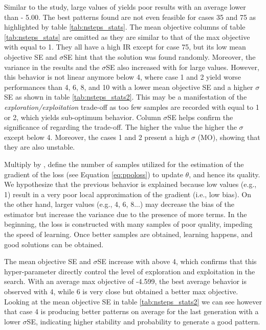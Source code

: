Similar to the  study, large values of  yields poor results with an average lower than - 5.00. The best patterns found are not even feasible for cases 35 and 75 as highlighted by table \ref{tab:nsteps_stats}. The mean objective columns of table \ref{tab:nsteps_stats} are omitted as they are similar to that of the max objective with  equal to 1. They all have a high IR except for case 75, but its low mean objective SE and $\sigma$SE hint that the solution was found randomly. Moreover, the variance in the results and the $\sigma$SE also increased with  for large values. However, this behavior is not linear anymore below 4, where case 1 and 2 yield worse performances than 4, 6, 8, and 10 with a lower mean objective SE and a higher $\sigma$SE as shown in table \ref{tab:nsteps_stats2}. This may be a manifestation of the \textit{exploration/exploitation} trade-off as too few samples are recorded with  equal to 1 or 2, which yields sub-optimum behavior. Column $\sigma$SE helps confirm the significance of  regarding the trade-off. The higher the value the higher the $\sigma$ except below 4. Moreover, the cases 1 and 2 present a high $\sigma$ (MO), showing that they are also unstable.  

Multiply by ,  define the number of samples utilized for the estimation of the gradient of the loss (see Equation \ref{eq:ppoloss}) to update $\theta$, and hence its quality. We hypothesize that the previous behavior is explained because low values (e.g., 1) result in a very poor local approximation of the gradient (i.e., low bias). On the other hand, larger values (e.g., 4, 6, 8...) may decrease the bias of the estimator but increase the variance due to the presence of more terms. In the beginning, the loss is constructed with many samples of poor quality, impeding the speed of learning. Once better samples are obtained, learning happens, and good solutions can be obtained.
  
The mean objective SE and $\sigma$SE increase with  above 4, which confirms that this hyper-parameter directly control the level of exploration and exploitation in the search. With an average max objective of -4.599, the best average behavior is observed with 4, while 6 is very close but obtained a better max objective. Looking at the mean objective SE in table \ref{tab:nsteps_stats2} we can see however that case 4 is producing better patterns on average for the last generation with a lower $\sigma$SE, indicating  higher stability and probability to generate a good pattern.

